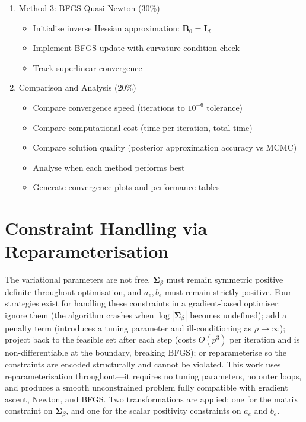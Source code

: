 \documentclass[11pt]{article}
\begin{document}
\begin{enumerate}[leftmargin=*]
\item Method 3: BFGS Quasi-Newton (30\%)
\begin{itemize}
\item Initialise inverse Hessian approximation: $\bm{B}_0 = \bm{I}_d$ 
\item Implement BFGS update with curvature condition check
\item Track superlinear convergence
\end{itemize}

\item Comparison and Analysis (20\%)
\begin{itemize}
\item Compare convergence speed (iterations to $10^{-6}$ tolerance)
\item Compare computational cost (time per iteration, total time)
\item Compare solution quality (posterior approximation accuracy vs MCMC)
\item Analyse when each method performs best
\item Generate convergence plots and performance tables
\end{itemize}
\end{enumerate}

\newpage
\section*{Constraint Handling via Reparameterisation}

The variational parameters are not free. $\bm{\Sigma}_\beta$ must remain symmetric positive definite throughout optimisation, and $a_e, b_e$ must remain strictly positive. Four strategies exist for handling these constraints in a gradient-based optimiser: ignore them (the algorithm crashes when $\log|\bm{\Sigma}_\beta|$ becomes undefined); add a penalty term (introduces a tuning parameter and ill-conditioning as $\rho \to \infty$); project back to the feasible set after each step (costs $O(p^3)$ per iteration and is non-differentiable at the boundary, breaking BFGS); or reparameterise so the constraints are encoded structurally and cannot be violated. This work uses reparameterisation throughout---it requires no tuning parameters, no outer loops, and produces a smooth unconstrained problem fully compatible with gradient ascent, Newton, and BFGS. Two transformations are applied: one for the matrix constraint on $\bm{\Sigma}_\beta$, and one for the scalar positivity constraints on $a_e$ and $b_e$.
\end{document}
